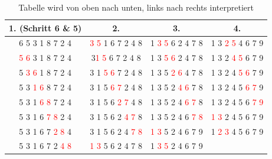 \documentclass[a4paper]{article}
\begin{document}
    \begin{table}[h]
        \centering
        \begin{tabular}{c|c|c|c}
            \textbf{1. (Schritt 6 \& 5)}    & 
            \textbf{2.}    & 
            \textbf{3.}    &
            \textbf{4.}   \\
            
            \hline
            6 5 3 1 8 7 2 4 & 
            \textcolor{red}{3 5} 1 6 7 2 4 8  &
            1 \textcolor{red}{3 5} 6 2 4 7 8 & 
            1 3 \textcolor{red}{2 5} 4 6 7 9 \\
            
            \textcolor{red}  {5 6} 3 1 8 7 2 4 &
            3\textcolor{red} {1 5} 6 7 2 4 8 &
            1 3 \textcolor{red}{5 6} 2 4 7 8 & 
            1 3 2 \textcolor{red}{4 5} 6 7 9 \\
            
            5 \textcolor{red}{3 6} 1 8 7 2 4 &
            3 1 \textcolor{red}{5 6} 7 2 4 8 &
            1 3 5 \textcolor{red}{2 6} 4 7 8 &
            1 3 2 4 \textcolor{red}{5 6} 7 9 \\

            5 3 \textcolor{red}{1 6} 8 7 2 4 & 
            3 1 5 \textcolor{red}{6 7} 2 4 8 &
            1 3 5 2 \textcolor{red}{4 6} 7 8 &
            1 3 2 4 5 \textcolor{red}{6 7} 9 \\

            5 3 1 \textcolor{red}{6 8} 7 2 4 &
            3 1 5 6 \textcolor{red}{2 7} 4 8 &
            1 3 5 2 4 \textcolor{red}{6 7} 8 &
            1 3 2 4 5 6 \textcolor{red}{7 9} \\

            5 3 1 6 \textcolor{red}{7 8} 2 4 &
            3 1 5 6 2 \textcolor{red}{4 7} 8 &
            1 3 5 2 4 6 \textcolor{red}{7 8} &
            \textcolor{red}{1 3} 2 4 5 6 7 9\\

            5 3 1 6 7  \textcolor{red}{2 8} 4 &
            3 1 5 6 2 4  \textcolor{red}{7 8} &
             \textcolor{red}{1 3} 5 2 4 6 7 9 &
            1  \textcolor{red}{2 3} 4 5 6 7 9 \\

            5 3 1 6 7 2 \textcolor{red}{4 8} & 
          \textcolor{red}{1 3} 5 6 2 4 7 8 &
            1 \textcolor{red}{3 5} 2 4 6 7 9 &
            \\
       
        \end{tabular}
        \caption{Tabelle wird von oben nach unten, links nach rechts interpretiert}
        \label{tab:BubblesortTable}
    \end{table}
\newpage
\end{document}

